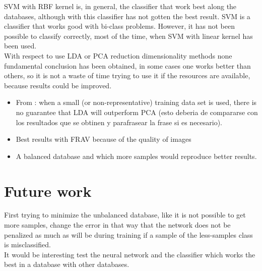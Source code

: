 SVM with RBF kernel is, in general, the classifier that work best along the databases, although with this classifier has not gotten the best result. SVM is a classifier that works good with bi-class problems. However, it has not been possible to classify correctly, most of the time, when SVM with linear kernel has been used.\\

With respect to use LDA or PCA reduction dimensionality methods none fundamental conclusion has been obtained, in some cases one works better than others, so it is not a waste of time trying to use it if the resources are available, because results could be improved.\\

\begin{itemize}
\item From \cite{PCAvsLDA}: when a small (or non-representative) training data set is used, there is no guarantee that LDA will outperform PCA (esto deberia de compararse con los resultados que se obtinen y parafrasear la frase si es necesario).
\item Best results with FRAV because of the quality of images
\item A balanced database and which more samples would reproduce better results.
\end{itemize}

\section{Future work}
First trying to minimize the unbalanced database, like it is not possible to get more samples, change the error in that way that the network does not be penalized as much as will be during training if a sample of the less-samples class  is misclassified.\\

It would be interesting test the neural network and the classifier which works the best in a database with other databases. \\
